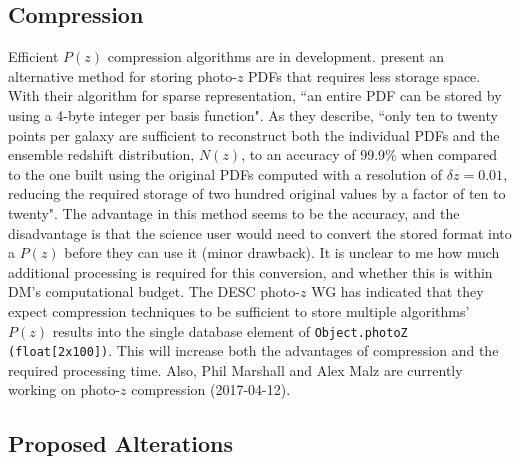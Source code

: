 \documentclass[DM,lsstdraft,toc]{lsstdoc}
\begin{document}
\subsection{Compression}\label{ssec:format_compression}

Efficient $P(z)$ compression algorithms are in development. \cite{2014MNRAS.441.3550C} present an alternative method for storing photo-$z$ PDFs that requires less storage space. With their algorithm for sparse representation, ``an entire PDF can be stored by using a 4-byte integer per basis function". As they describe, ``only ten to twenty points per galaxy are sufficient to reconstruct both the individual PDFs and the ensemble redshift distribution, $N(z)$, to an accuracy of 99.9\% when compared to the one built using the original PDFs computed with a resolution of $\delta z = 0.01$, reducing the required storage of two hundred original values by a factor of ten to twenty". The advantage in this method seems to be the accuracy, and the disadvantage is that the science user would need to convert the stored format into a $P(z)$ before they can use it (minor drawback). It is unclear to me how much additional processing is required for this conversion, and whether this is within DM's computational budget. The DESC photo-$z$ WG has indicated that they expect compression techniques to be sufficient to store multiple algorithms' $P(z)$ results into the single database element of {\tt Object.photoZ (float[2x100])}. This will increase both the advantages of compression and the required processing time. Also, Phil Marshall and Alex Malz are currently working on photo-$z$ compression (2017-04-12).

\subsection{Proposed Alterations}\label{ssec:format_summary}
\end{document}
